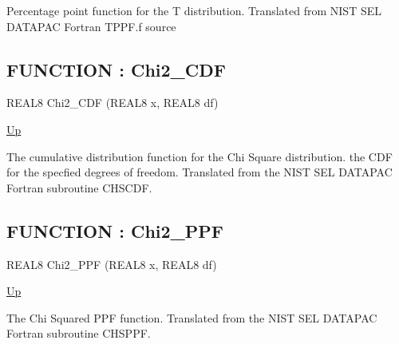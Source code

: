 \par
Percentage point function for the T distribution. Translated from NIST SEL DATAPAC Fortran TPPF.f source
\par
\subsection*{FUNCTION : Chi2\_CDF}
\hypertarget{ecldoc:ml_core.math.distributions.chi2_cdf}{}
\begin{minipage}[t]{\textwidth}
\begin{flushleft}
REAL8 Chi2\_CDF (REAL8 x, REAL8 df)
\end{flushleft}
\end{minipage}
\hyperlink{ecldoc:ML_Core.Math.Distributions}{Up}

\par
The cumulative distribution function for the Chi Square distribution. the CDF for the specfied degrees of freedom. Translated from the NIST SEL DATAPAC Fortran subroutine CHSCDF.
\par
\subsection*{FUNCTION : Chi2\_PPF}
\hypertarget{ecldoc:ml_core.math.distributions.chi2_ppf}{}
\begin{minipage}[t]{\textwidth}
\begin{flushleft}
REAL8 Chi2\_PPF (REAL8 x, REAL8 df)
\end{flushleft}
\end{minipage}
\hyperlink{ecldoc:ML_Core.Math.Distributions}{Up}

\par
The Chi Squared PPF function. Translated from the NIST SEL DATAPAC Fortran subroutine CHSPPF.
\par

